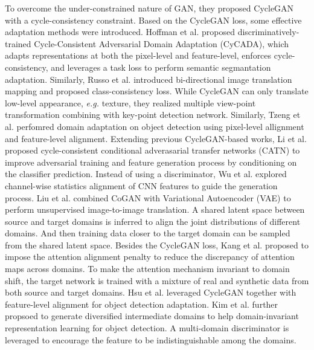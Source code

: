 \documentclass[conference]{IEEEtran}
\begin{document}
To overcome the under-constrained nature of GAN, they proposed CycleGAN
with a cycle-consistency constraint. 
Based on the CycleGAN loss, some effective adaptation methods were introduced.
Hoffman et al. proposed discriminatively-trained Cycle-Consistent Adversarial
Domain Adaptation (CyCADA), which adapts representations at both the pixel-level
and feature-level, enforces cycle-consistency, and leverages a task loss
to perform semantic segmantation adaptation. 
Similarly, Russo et al. introduced bi-directional image translation mapping 
and proposed class-consistency loss. 
While CycleGAN can only translate low-level appearance, \textit{e.g.} texture,
they realized multiple view-point transformation combining with key-point detection 
network. 
Similarly, Tzeng et al. perfomred domain adaptation on object detection using pixel-level
allignment and feature-level alignment. 
Extending previous CycleGAN-based works, Li et al. proposed cycle-consistent
conditional adverasarial transfer networks (CATN) to improve adversarial training 
and feature generation process by conditioning on the classifier prediction.
Instead of using a discriminator, Wu et al. explored channel-wise statistics 
alignment of CNN features to guide the generation process.
Liu et al. combined CoGAN with Variational Autoencoder (VAE) to perform unsupervised 
image-to-image translation. 
A shared latent space between source and target domains is inferred to align the joint 
distributions of different domains. 
And then training data closer to the target domain can be sampled from the shared latent space.
Besides the CycleGAN loss, Kang et al. proposed to impose the attention alignment
penalty to reduce the discrepancy of attention maps across domains.
To make the attention mechanism invariant to domain shift, the target network
is trained with a mixture of real and synthetic data from both source and target domains.
Hsu et al. leveraged CycleGAN together with feature-level alignment for 
object detection adaptation. 
Kim et al. further propsoed to generate diversified intermediate domains to 
help domain-invariant representation learning for object detection.
A multi-domain discriminator is leveraged to encourage the feature to be 
indistinguishable among the domains. 
\end{document}
